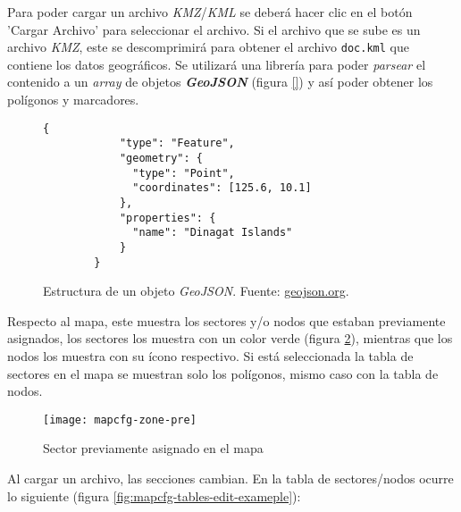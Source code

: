 Para poder cargar un archivo \textit{KMZ}/\textit{KML} se deberá hacer clic en el botón 'Cargar Archivo' para seleccionar el archivo. Si el archivo que se sube es un archivo \textit{KMZ}, este se descomprimirá para obtener el archivo \texttt{doc.kml} que contiene los datos geográficos. Se utilizará una librería para poder \textit{parsear} el contenido a un \textit{array} de objetos \textit{\textbf{GeoJSON}} (figura \ref{}) y así poder obtener los polígonos y marcadores.

\begin{figure}[H]
    \centering
    \begin{lstlisting}[frame=single, basicstyle=\ttfamily\small]
        {
            "type": "Feature",
            "geometry": {
              "type": "Point",
              "coordinates": [125.6, 10.1]
            },
            "properties": {
              "name": "Dinagat Islands"
            }
        }     
    \end{lstlisting}
    \caption{Estructura de un objeto \textit{GeoJSON}. Fuente: \href{https://geojson.org/}{geojson.org}.}
    \label{fig:ejemplo-geojson}
\end{figure}

Respecto al mapa, este muestra los sectores y/o nodos que estaban previamente asignados, los sectores los muestra con un color verde (figura \ref{fig:mapcfg-zone-pre}), mientras que los nodos los muestra con su ícono respectivo. Si está seleccionada la tabla de sectores en el mapa se muestran solo los polígonos, mismo caso con la tabla de nodos.
\begin{figure}[H]
	\centering
	\texttt{[image: mapcfg-zone-pre]}
	\caption{\label{fig:mapcfg-zone-pre} Sector previamente asignado en el mapa}
\end{figure}

Al cargar un archivo, las secciones cambian. En la tabla de sectores/nodos ocurre lo siguiente (figura \ref{fig:mapcfg-tables-edit-exameple}):

